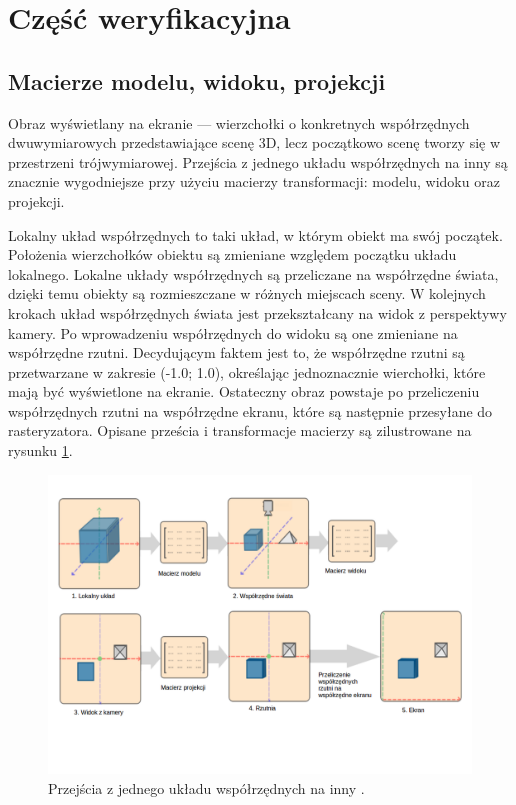 \newpage
\section{Część weryfikacyjna}
\subsection{Macierze modelu, widoku, projekcji}
Obraz wyświetlany na ekranie --- wierzchołki o konkretnych współrzędnych dwuwymiarowych przedstawiające scenę 3D, lecz początkowo scenę tworzy się w przestrzeni trójwymiarowej. Przejścia z jednego układu współrzędnych na inny są znacznie wygodniejsze przy użyciu macierzy transformacji: modelu, widoku oraz projekcji. 

Lokalny układ współrzędnych to taki układ, w którym obiekt ma swój początek. Położenia wierzchołków obiektu są zmieniane względem początku układu lokalnego. Lokalne układy współrzędnych są przeliczane na współrzędne świata, dzięki temu obiekty są rozmieszczane w różnych miejscach sceny. W kolejnych krokach układ współrzędnych świata jest przekształcany na widok z perspektywy kamery. Po wprowadzeniu współrzędnych do widoku są one zmieniane na współrzędne rzutni. Decydującym faktem jest to, że współrzędne rzutni są przetwarzane w zakresie (-1.0; 1.0), określając jednoznacznie wierchołki, które mają być wyświetlone na ekranie. Ostateczny obraz powstaje po przeliczeniu współrzędnych rzutni na współrzędne ekranu, które są następnie przesyłane do rasteryzatora. Opisane prześcia i transformacje macierzy są zilustrowane na rysunku \ref{rys11}.

\begin{figure}[H]
		\centering
 		\includegraphics[width=12.0cm]{coordinate_systems.png}
    	\caption{Przejścia z jednego układu współrzędnych na inny \cite{opengltutorial}.}
 		\label{rys11}
\end{figure}

